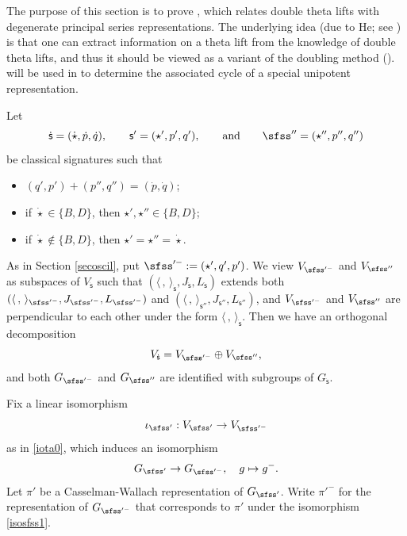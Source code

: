 \documentclass[11pt,a4paper]{amsart}
\newcommand{\la}{\langle}
\newcommand{\ra}{\rangle}
\newcommand{\be}{\begin {equation}}
\newcommand{\ee}{\end {equation}}
\numberwithin{equation}{section}
\theoremstyle{remark}
\begin{document}
\def\GLE{\GL(\bfE)^{J_{\bfU}}}
\def\GLEz{\GL_{\bfE_0}}
\def\GLE{{\GL_{\bfE}}}
\def\wtGLE{\widetilde{\GLE}}
\def\wtGLEz{\widetilde{\GLEz}}
\def\wtPE{\widetilde{P_\bfE}}
\def\JU{{J_{\bfU}}}
\def\LU{{L_{\bfU}}}
\def\wtGU{\widetilde{G}_\bfU}
\def\dsfss{{\dot{\mathsf s}}}


The purpose of this section is to prove , which relates double theta lifts with degenerate principal series representations. The underlying idea (due to He; see \cite[Chapter 4]{He}) is that one can extract information on a theta lift from the knowledge of double theta lifts, and thus it should be viewed as a variant of the doubling method (\cite[Section II]{Ra}).   will be used in  to determine the associated cycle of a special unipotent representation.   

Let
\[
\dot{ \mathsf s}=(\dot \star, \dot p,\dot q),\qquad  \mathsf s'=(\star', p',q'),\qquad \textrm{and}\qquad \sfss''=(\star'', p'', q'')
\]
be classical signatures such that
\begin{itemize}
  \item $ (q', p')+(p'', q'')=(\dot p, \dot q)$;\smallskip
  \item if $\dot \star\in \{B,D\}$,  then $\star', \star''\in \{B,D\}$; \smallskip
  \item if $\dot \star\notin \{B,D\}$,  then $\star'=\star''=\dot \star$.
\end{itemize}

As in Section \ref{secoscil}, put $\sfss'^-:=(\star', q', p')$. We view $V_{\sfss'^-}$ and $V_{\sfss''}$ as subspaces of $V_\dsfss$ such that $(\la\,,\,\ra_{\dsfss}, J_{\dsfss},L_{\dsfss})$  extends both $(\la\,,\,\ra_{\sfss'^-}, J_{\sfss'^-}, L_{\sfss'^-})$ and
$(\la\,,\,\ra_{\mathsf s''}, J_{\mathsf s''}, L_{\mathsf s''})$, and $V_{\sfss'^-}$ and $V_{\sfss''}$ are perpendicular to each other under the form $\la\,,\,\ra_{\dsfss}$. Then we have an orthogonal decomposition
\[
  V_\dsfss=V_{\sfss'^-}\oplus V_{\sfss''},
\]
and both $G_{\sfss'^-}$ and $G_{\sfss''}$ are identified with subgroups of $G_{\dsfss}$.

 Fix a linear isomorphism
\be\label{iota1}
 \iota_{\sfss'}:  V_{\sfss'}\rightarrow V_{\sfss'^-}%
\ee
as in \eqref{iota0}, which  induces an isomorphism
\be\label{isosfss1}
 G_{\sfss'}\rightarrow G_{\sfss'^-}, \quad g\mapsto g^-.
\ee
Let $\pi'$ be a Casselman-Wallach representation of $G_{\sfss'}$. Write $\pi'^-$ for the representation of $G_{\sfss'^-}$ that corresponds to $\pi'$ under the isomorphism \eqref{isosfss1}.
\end{document}
